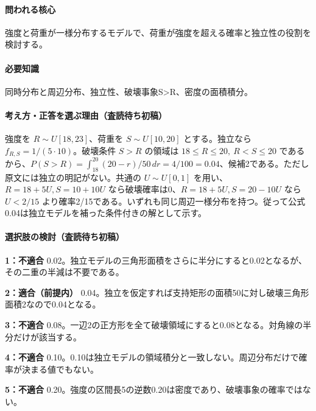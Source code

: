 \paragraph{問われる核心} 強度と荷重が一様分布するモデルで、荷重が強度を超える確率と独立性の役割を検討する。

\paragraph{必要知識} 同時分布と周辺分布、独立性、破壊事象S>R、密度の面積積分。

\paragraph{考え方・正答を選ぶ理由（査読待ち初稿）} 強度を \(R\sim U[18,23]\)、荷重を \(S\sim U[10,20]\) とする。独立なら \(f_{R,S}=1/(5\cdot10)\)。破壊条件 \(S>R\) の領域は \(18\le R\le20,\ R<S\le20\) であるから、\(P(S>R)=\int_{18}^{20}(20-r)/50\,dr=4/100=0.04\)、候補2である。ただし原文には独立の明記がない。共通の \(U\sim U[0,1]\) を用い、\(R=18+5U,S=10+10U\) なら破壊確率は0、\(R=18+5U,S=20-10U\) なら \(U<2/15\) より確率2/15である。いずれも同じ周辺一様分布を持つ。従って公式0.04は独立モデルを補った条件付きの解として示す。

\paragraph{選択肢の検討（査読待ち初稿）}\mbox{}\par

\noindent\textbf{1：不適合} 0.02。独立モデルの三角形面積をさらに半分にすると0.02となるが、その二重の半減は不要である。\par

\noindent\textbf{2：適合（前提内）} 0.04。独立を仮定すれば支持矩形の面積50に対し破壊三角形面積2なので0.04となる。\par

\noindent\textbf{3：不適合} 0.08。一辺2の正方形を全て破壊領域にすると0.08となる。対角線の半分だけが該当する。\par

\noindent\textbf{4：不適合} 0.10。0.10は独立モデルの領域積分と一致しない。周辺分布だけで確率が決まる値でもない。\par

\noindent\textbf{5：不適合} 0.20。強度の区間長5の逆数0.20は密度であり、破壊事象の確率ではない。\par

